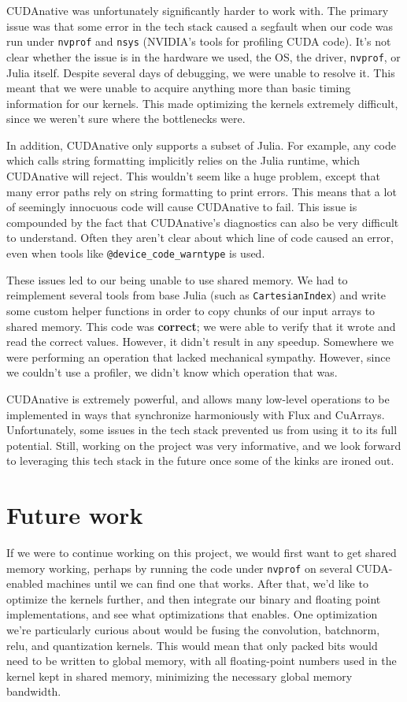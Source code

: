 \documentclass[12pt]{article}
\begin{document}
CUDAnative was unfortunately significantly harder to work with. The primary issue was that some error in the tech stack caused a segfault when our code was run under \texttt{nvprof} and \texttt{nsys} (NVIDIA's tools for profiling CUDA code). It's not clear whether the issue is in the hardware we used, the OS, the driver, \texttt{nvprof}, or Julia itself. Despite several days of debugging, we were unable to resolve it. This meant that we were unable to acquire anything more than basic timing information for our kernels. This made optimizing the kernels extremely difficult, since we weren't sure where the bottlenecks were.

In addition, CUDAnative only supports a subset of Julia. For example, any code which calls string formatting implicitly relies on the Julia runtime, which CUDAnative will reject. This wouldn't seem like a huge problem, except that many error paths rely on string formatting to print errors. This means that a lot of seemingly innocuous code will cause CUDAnative to fail.
 This issue is compounded by the fact that CUDAnative's diagnostics can also be very difficult to understand. Often they aren't clear about which line of code caused an error, even when tools like \texttt{@device\_code\_warntype} is used.

These issues led to our being unable to use shared memory. We had to reimplement several tools from base Julia (such as \texttt{CartesianIndex}) and write some custom helper functions in order to copy chunks of our input arrays to shared memory. This code was \textbf{correct}; we were able to verify that it wrote and read the correct values. However, it didn't result in any speedup. Somewhere we were performing an operation that lacked mechanical sympathy. However, since we couldn't use a profiler, we didn't know which operation that was.

CUDAnative is extremely powerful, and allows many low-level operations to be implemented in ways that synchronize harmoniously with Flux and CuArrays. Unfortunately, some issues in the tech stack prevented us from using it to its full potential. Still, working on the project was very informative, and we look forward to leveraging this tech stack in the future once some of the kinks are ironed out.

\section{Future work}
\label{sec:org10fb8c9}
If we were to continue working on this project, we would first want to get shared memory working, perhaps by running the code under \texttt{nvprof} on several CUDA-enabled machines until we can find one that works.
After that, we'd like to optimize the kernels further, and then integrate our binary and floating point implementations, and see what optimizations that enables.
One optimization we're particularly curious about would be fusing the convolution, batchnorm, relu, and quantization kernels. This would mean that only packed bits would need to be written to global memory, with all floating-point numbers used in the kernel kept in shared memory, minimizing the necessary global memory bandwidth.
\end{document}
